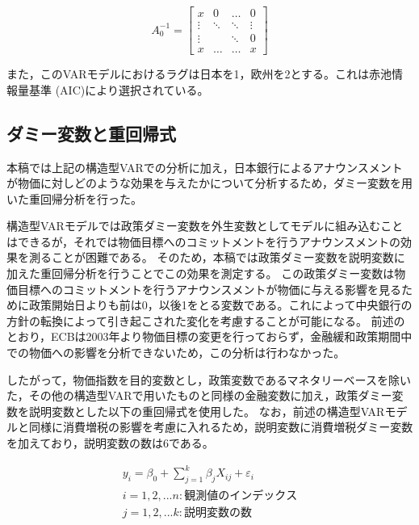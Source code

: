 \documentclass[12pt]{jarticle}
\begin{document}
{\begin{equation}
  \label{eq3}
  A_0^{-1} = \left[
    \begin{array} {cccc}
      x      & 0      & \ldots & 0      \\
      \vdots & \ddots & \ddots & \vdots \\
      \vdots & \      & \ddots & 0      \\
      x      & \ldots & \ldots & x
    \end{array}
    \right]
\end{equation}

また，このVARモデルにおけるラグは日本を1，欧州を2とする。これは赤池情報量基準 (AIC)により選択されている。

\subsection{ダミー変数と重回帰式}

本稿では上記の構造型VARでの分析に加え，日本銀行によるアナウンスメントが物価に対しどのような効果を与えたかについて分析するため，ダミー変数を用いた重回帰分析を行った。

構造型VARモデルでは政策ダミー変数を外生変数としてモデルに組み込むことはできるが，それでは物価目標へのコミットメントを行うアナウンスメントの効果を測ることが困難である。
そのため，本稿では政策ダミー変数を説明変数に加えた重回帰分析を行うことでこの効果を測定する。
この政策ダミー変数は物価目標へのコミットメントを行うアナウンスメントが物価に与える影響を見るために政策開始日よりも前は0，以後1をとる変数である。これによって中央銀行の方針の転換によって引き起こされた変化を考慮することが可能になる。
前述のとおり，ECBは2003年より物価目標の変更を行っておらず，金融緩和政策期間中での物価への影響を分析できないため，この分析は行わなかった。

したがって，物価指数を目的変数とし，政策変数であるマネタリーベースを除いた，その他の構造型VARで用いたものと同様の金融変数に加え，政策ダミー変数を説明変数とした以下の重回帰式を使用した。
なお，前述の構造型VARモデルと同様に消費増税の影響を考慮に入れるため，説明変数に消費増税ダミー変数を加えており，説明変数の数は6である。

\begin{equation}
  \label{eq4}
  \begin{gathered}
    y_i = \beta_0 + \sum_{j=1}^k \beta_j X_{ij} + \varepsilon_i \\
    i=1,2,...n :観測値のインデックス\\
    j=1,2,...k :説明変数の数\\
  \end{gathered}
\end{equation}

}
\end{document}
